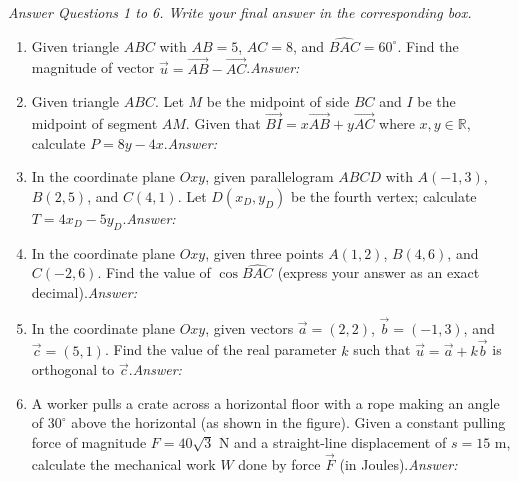\documentclass[10pt,a4paper]{article}
\newcommand{\parttitle}[1]{\par\vspace{3.5pt}\needspace{3\baselineskip}{\large\bfseries\color{ink}#1}\par\nopagebreak\vspace{2pt}}
\newcommand{\answerbox}{\hfill\mbox{\textit{Answer:}\ \fbox{\rule{0pt}{7.5pt}\hspace{1.8cm}}}}
\begin{document}
\pagebreak
\parttitle{PART III. Short-Answer Questions}
\textit{Answer Questions 1 to 6. Write your final answer in the corresponding box.}
\begin{enumerate}
\item Given triangle $ABC$ with $AB = 5$, $AC = 8$, and $\widehat{BAC} = 60^\circ$. Find the magnitude of vector $\vec{u} = \vec{AB} - \vec{AC}$.\answerbox

\item Given triangle $ABC$. Let $M$ be the midpoint of side $BC$ and $I$ be the midpoint of segment $AM$. Given that $\vec{BI} = x\vec{AB} + y\vec{AC}$ where $x, y \in \mathbb{R}$, calculate $P = 8y - 4x$.\answerbox

\item In the coordinate plane $Oxy$, given parallelogram $ABCD$ with $A(-1, 3)$, $B(2, 5)$, and $C(4, 1)$. Let $D(x_D, y_D)$ be the fourth vertex; calculate $T = 4x_D - 5y_D$.\answerbox

\item In the coordinate plane $Oxy$, given three points $A(1, 2)$, $B(4, 6)$, and $C(-2, 6)$. Find the value of $\cos \widehat{BAC}$ (express your answer as an exact decimal).\answerbox

\item In the coordinate plane $Oxy$, given vectors $\vec{a} = (2, 2)$, $\vec{b} = (-1, 3)$, and $\vec{c} = (5, 1)$. Find the value of the real parameter $k$ such that $\vec{u} = \vec{a} + k\vec{b}$ is orthogonal to $\vec{c}$.\answerbox

\item \begin{minipage}[t]{0.70\linewidth}
A worker pulls a crate across a horizontal floor with a rope making an angle of $30^\circ$ above the horizontal (as shown in the figure). Given a constant pulling force of magnitude $F = 40\sqrt{3}\text{ N}$ and a straight-line displacement of $s = 15\text{ m}$, calculate the mechanical work $W$ done by force $\vec{F}$ (in Joules).\answerbox
\end{minipage}\hfill
\begin{minipage}[t]{0.28\linewidth}\raggedleft\vspace{-6pt}
\end{minipage}
\end{enumerate}
\end{document}
